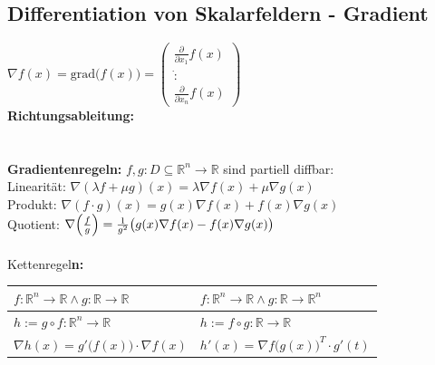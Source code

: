 \documentclass[6pt,a4paper]{scrartcl}
\let\olddot = \dot
\newcommand{\norm}[1]{\ensuremath{\|#1\|}}														%
\newcommand{\svdots}{\ensuremath{\olddot :}}													%
\renewcommand{\vec}[1]{\ensuremath{\boldsymbol {#1}}}											%
\renewcommand{\emph}[1]{\textbf{#1}}															%
\renewcommand*{\dot}[1]{\accentset{\mbox{\textrm{\large\bfseries .}} }{#1}}						%
\begin{document}
\begin{multicols*}{4}
\subsection{Differentiation von Skalarfeldern - Gradient}
$\nabla f(x) = \mathrm{grad} \bigl( f(x) \bigr) = \begin{pmatrix}  \frac{\partial}{\partial x_1} f(x) \\ \svdots \\ \frac{\partial}{\partial x_n} f(x) \end{pmatrix}$\\
\emph{Richtungsableitung:} \boxed { \partial_{\vec v} f(x) = \left\langle \nabla f(x), \vec v \right\rangle } \quad \boxed{ \norm{\vec v}=1 }\\
\\
\\
\textbf{Gradientenregeln:} $f,g:D \subseteq \mathbb R^n \rightarrow \mathbb R$ sind partiell diffbar:\\
Linearität: $\nabla(\lambda f + \mu g) (x) = \lambda \nabla f(x) + \mu \nabla g(x)$\\
Produkt: $\nabla (f \cdot g) (x) = g(x) \nabla f(x) + f(x) \nabla g(x)$\\
Quotient: $\nabla \Bigl( \frac{f}{g} \Bigr) = \frac{1}{g^2} \bigl( g(x)\nabla f(x) - f(x) \nabla g(x) \bigr)$\\
\\
Kettenregel\textbf{n:}\\
\begin{tabular}{l|l}
	$f:\mathbb R^n \rightarrow \mathbb R \land g:\mathbb R \rightarrow \mathbb R$ & $f:\mathbb R^n \rightarrow \mathbb R \land g:\mathbb R \rightarrow \mathbb R^n$\\ \midrule
	$h:= g \circ f: \mathbb R^n \rightarrow \mathbb R$	& $h:= f \circ g: \mathbb R \rightarrow \mathbb R$\\
	$\boxed{ \nabla h(x) = g'\big( f(x) \big) \cdot \nabla f(x)}$  &  $\boxed{h'(x)=\nabla f\big( g(x) \big)^T \cdot g'(t)}$
\end{tabular}



\end{multicols*}
\end{document}
